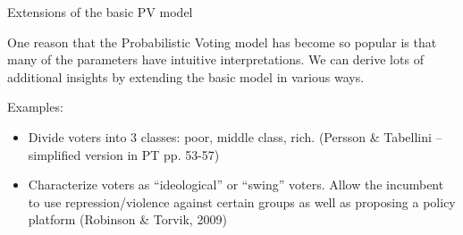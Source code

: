\documentclass[aspectratio=169]{beamer}
\begin{document}
\begin{frame}{Extensions of the basic PV model}

One reason that the Probabilistic Voting model has become so popular is that many of the parameters have intuitive interpretations. We can derive lots of additional insights by extending the basic model in various ways.
\pause 

Examples:
\begin{itemize}
\item Divide voters into 3 classes: poor, middle class, rich. (Persson & Tabellini -- simplified version in PT pp. 53-57)
\pause 
\item Characterize voters as ``ideological'' or ``swing'' voters. Allow the incumbent to use repression/violence against certain groups as well as proposing a policy platform (Robinson \& Torvik, 2009) 

\end{itemize}

\end{frame}
\end{document}
